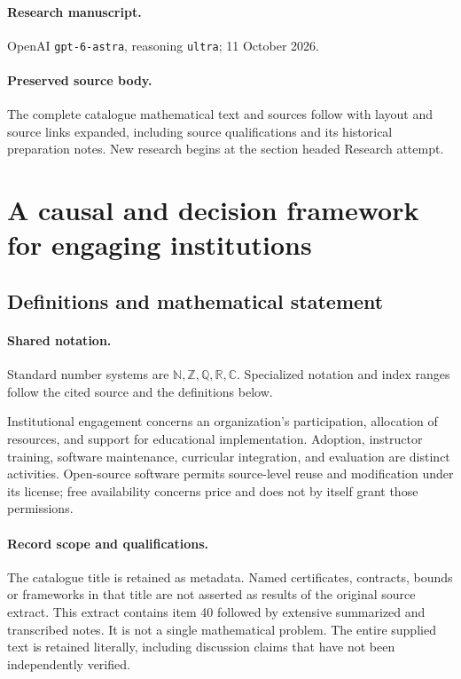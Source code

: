 \documentclass[11pt]{article}
\begin{document}
\paragraph{Research manuscript.} OpenAI \texttt{gpt-6-astra}, reasoning \texttt{ultra}; 11 October 2026.
\paragraph{Preserved source body.} The complete catalogue mathematical text and sources follow with layout and source links expanded, including source qualifications and its historical preparation notes. New research begins at the section headed Research attempt.

\section{A causal and decision framework for engaging institutions}\label{statement}

\subsection{Definitions and mathematical statement}

\paragraph{Shared notation.}Standard number systems are $\mathbb N,\mathbb Z,\mathbb Q,\mathbb R,\mathbb C$. Specialized notation and index ranges follow the cited source and the definitions below.


Institutional engagement concerns an organization's participation, allocation of resources, and support for educational implementation. Adoption, instructor training, software maintenance, curricular integration, and evaluation are distinct activities. Open-source software permits source-level reuse and modification under its license; free availability concerns price and does not by itself grant those permissions.
\paragraph{Record scope and qualifications.}
The catalogue title is retained as metadata. Named certificates, contracts, bounds or frameworks in that title are not asserted as results of the original source extract.
This extract contains item 40 followed by extensive summarized and transcribed notes. It is not a single mathematical problem. The entire supplied text is retained literally, including discussion claims that have not been independently verified.
\end{document}
